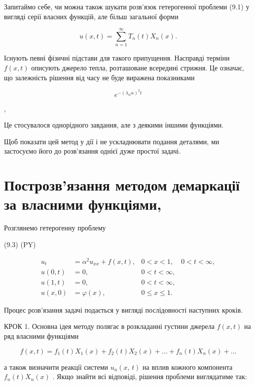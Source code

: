 \documentclass[
  ukrainian,
]{article}
\begin{document}
Запитаймо себе, чи можна також шукати розв'язок гетерогенної проблеми
(9.1) у вигляді серії власних функцій, але більш загальної форми

\[
u(x, t) = \sum_{n=1}^{\infty} T_n(t) X_n(x).
\]

Існують певні фізичні підстави для такого припущення. Насправді терміни
\(f(x,t)\) описують джерело тепла, розташоване всередині стрижня. Це
означає, що залежність рішення від часу не буде виражена показниками

\[
e^{-(\lambda_n\alpha)^2 t}
\]

,

Це стосувалося однорідного завдання, але з деякими іншими функціями.

Щоб показати цей метод у дії і не ускладнювати подання деталями, ми
застосуємо його до розв'язання однієї дуже простої задачі.

\section{Построзв'язання методом демаркації за власними
функціями,}\label{ux43fux43eux441ux442ux440ux43eux437ux432ux44fux437ux430ux43dux43dux44f-ux43cux435ux442ux43eux434ux43eux43c-ux434ux435ux43cux430ux440ux43aux430ux446ux456ux457-ux437ux430-ux432ux43bux430ux441ux43dux438ux43cux438-ux444ux443ux43dux43aux446ux456ux44fux43cux438}

Розглянемо гетерогенну проблему

(9.3) (PY)

\[
\begin{aligned} u_t &= \alpha^2 u_{xx} + f(x, t), & 0 < x < 1, & 0 < t < \infty, \\ u(0, t) &= 0, & 0 < t < \infty, \\ u(1, t) &= 0, & 0 < t < \infty, \\ u(x, 0) &= \varphi(x), & 0 \leqslant x \leqslant 1. \end{aligned}
\]

Процес розв'язання задачі подається у вигляді послідовності наступних
кроків.

КРОК 1. Основна ідея методу полягає в розкладанні густини джерела
\(f(x, t)\) на ряд власними функціями

\[
f(x, t) = f_1(t) X_1(x) + f_2(t) X_2(x) + \dots + f_n(t) X_n(x) + \dots
\]

а також визначити реакції системи \(u_n\left(x,\,t\right)\) на вплив
кожного компонента \(f_n\left(t\right)X_n\left(x\right)\) . Якщо знайти
всі відповіді, рішення проблеми виглядатиме так:
\end{document}
